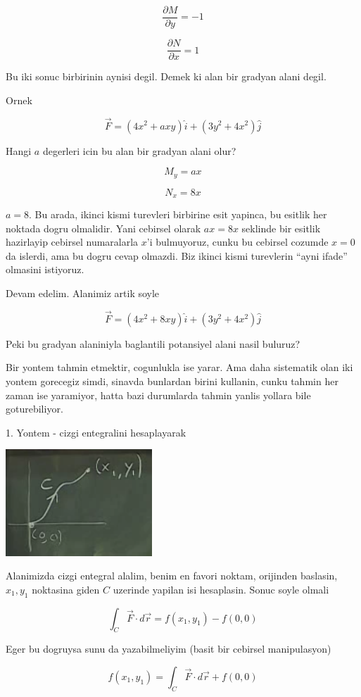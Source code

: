 \documentclass[12pt,fleqn]{article}
\begin{document}
\[ \frac{\partial M}{\partial y} = -1 \]

\[ \frac{\partial N}{\partial x} = 1 \]

Bu iki sonuc birbirinin aynisi degil. Demek ki alan bir gradyan alani
degil. 

Ornek

\[ \vec{F} = (4x^2 + axy)\hat{i} + (3y^2 + 4x^2)\hat{j} \]

Hangi $a$ degerleri icin bu alan bir gradyan alani olur? 

\[ M_y = ax \]

\[ N_x = 8x \]

$a=8$. Bu arada, ikinci kismi turevleri birbirine esit yapinca, bu esitlik
her noktada dogru olmalidir. Yani cebirsel olarak $ax = 8x$ seklinde bir
esitlik hazirlayip cebirsel numaralarla $x$'i bulmuyoruz, cunku bu cebirsel
cozumde $x=0$ da islerdi, ama bu dogru cevap olmazdi. Biz ikinci kismi
turevlerin ``ayni ifade'' olmasini istiyoruz.

Devam edelim. Alanimiz artik soyle

\[ \vec{F} = (4x^2 + 8xy)\hat{i} + (3y^2 + 4x^2)\hat{j} \]

Peki bu gradyan alaniniyla baglantili potansiyel alani nasil buluruz? 

Bir yontem tahmin etmektir, cogunlukla ise yarar. Ama daha sistematik olan
iki yontem gorecegiz simdi, sinavda bunlardan birini kullanin, cunku tahmin
her zaman ise yaramiyor, hatta bazi durumlarda tahmin yanlis yollara bile
goturebiliyor. 

1. Yontem - cizgi entegralini hesaplayarak 

\includegraphics[height=4cm]{21_2.png}

Alanimizda cizgi entegral alalim, benim en favori noktam, orijinden
baslasin, $x_1,y_1$ noktasina giden $C$ uzerinde yapilan isi hesaplasin.
Sonuc soyle olmali

\[ \int_C \vec{F} \cdot d\vec{r} = 
f(x_1,y_1) - f(0,0)
\]

Eger bu dogruysa sunu da yazabilmeliyim (basit bir cebirsel manipulasyon)

\[ f(x_1,y_1) = \int_C \vec{F} \cdot d\vec{r} + f(0,0) \]
\end{document}
